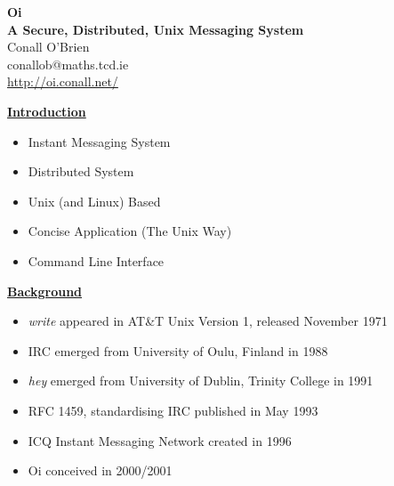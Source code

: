 \documentclass[a4,12pt]{seminar}
\newcommand{\SlideTitle}[1]{\Large \underline{\textbf{#1}}\normalsize}
\begin{document}
\pagestyle{empty}

\sffamily

\begin{slide}

\begin{center}

\textbf{
Oi \\ A Secure, Distributed, Unix Messaging System \\ }
\vspace{20mm}
Conall O'Brien \\
\vspace{15mm}
\scriptsize{
conallob@maths.tcd.ie \\ 
\url{http://oi.conall.net/}
}

\end{center}

\end{slide}


\begin{slide}{\SlideTitle{Introduction}}

\begin{itemize}

\item Instant Messaging System

\item Distributed System

\item Unix (and Linux) Based

\item Concise Application (The Unix Way)

\item Command Line Interface

\end{itemize} 

\vfill

\end{slide}


\begin{slide}{\SlideTitle{Background}}

\begin{itemize}

\item \emph{write} appeared in AT\&T Unix Version 1, released November 1971 

\item IRC emerged from University of Oulu, Finland in 1988

\item \emph{hey} emerged from University of Dublin, Trinity College in 1991

\item RFC 1459, standardising IRC published in May 1993

\item ICQ Instant Messaging Network created in 1996

\item Oi conceived in 2000/2001

\end{itemize}

\vfill

\end{slide}
\end{document}
